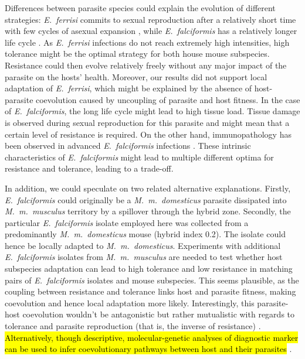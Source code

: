 \documentclass[12pt]{article}
\begin{document}
Differences between parasite species could explain the evolution of different strategies: \textit{E.~ferrisi} commits to sexual reproduction after a relatively short time with few cycles of asexual expansion \citep{al-khlifeh_eimeria_2019, ankrom_life_1975}, while \textit{E.~falciformis} has a relatively longer life cycle \citep{al-khlifeh_eimeria_2019, haberkorn_entwicklung_1970}. As \textit{E.~ferrisi }infections do not reach extremely high intensities, high tolerance might be the optimal strategy for both house mouse subspecies. Resistance could then evolve relatively freely without any major impact of the parasite on the hosts’ health. Moreover, our results did not support local adaptation of \textit{E.~ferrisi}, which might be explained by the absence of host-parasite coevolution caused by uncoupling of parasite and host fitness. In the case of \textit{E.~falciformis}, the long life cycle might lead to high tissue load. Tissue damage is observed during sexual reproduction for this parasite \citep{ehret_dual_2017} and might mean that a certain level of resistance is required. On the other hand, immunopathology has been observed in advanced \textit{E.~falciformis} infections \citep{stange_il-22_2012}. These intrinsic characteristics of \textit{E.~falciformis} might lead to multiple different optima for resistance and tolerance, leading to a trade-off.\par

In addition, we could speculate on two related alternative explanations. Firstly, \textit{E.~falciformis} could originally be a \textit{M.~m.~domesticus} parasite dissipated into \textit{M.~m.~musculus} territory by a spillover through the hybrid zone. Secondly, the particular \textit{E.~falciformis} isolate employed here was collected from a predominantly \textit{M.~m.~domesticus} mouse (hybrid index 0.2). The isolate could hence be locally adapted to \textit{M.~m.~domesticus}. Experiments with additional \textit{E.~falciformis} isolates from \textit{M.~m.~musculus} are needed to test whether host subspecies adaptation can lead to high tolerance and low resistance in matching pairs of \textit{E.~falciformis} isolates and mouse subspecies. This seems plausible, as the coupling between resistance and tolerance links host and parasite fitness, making coevolution and hence local adaptation more likely. Interestingly, this parasite-host coevolution wouldn’t be antagonistic but rather mutualistic with regards to tolerance and parasite reproduction (that is, the inverse of resistance) \citep{little_coevolution_2010, raaberg_decomposing_2009}. \hl{Alternatively, though descriptive, molecular-genetic analyses of diagnostic marker can be used to infer coevolutionary pathways between host and their parasites} \parencite[e.g. ][]{kvac_coevolution_2013,gouy_de_bellocq_holobiont_2018}.
\par
\end{document}
